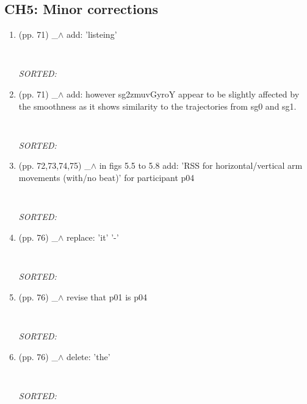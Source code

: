 \documentclass[12pt]{article}
\begin{document}
\subsection{CH5: Minor corrections}
\begin{enumerate}

\item  (pp. 71)  \_$\wedge$  
	add: 'listeing'
	\begin{verbatim}
	
	\end{verbatim}
	\textit{
	SORTED:  
	}
	\\

\item  (pp. 71)  \_$\wedge$  
	add: 
	however sg2zmuvGyroY appear to be slightly
	affected by the smoothness as it shows
	similarity to the trajectories from
	sg0 and sg1.
	\begin{verbatim}
	
	\end{verbatim}
	\textit{
	SORTED:  
	}
	\\


\item  (pp. 72,73,74,75)  \_$\wedge$  
	in figs 5.5 to 5.8
		add:
	'RSS for horizontal/vertical arm movements (with/no beat)' 
	for participant p04
	\begin{verbatim}
	
	\end{verbatim}
	\textit{
	SORTED:  
	}
	\\


\item  (pp. 76)  \_$\wedge$  
	replace: 'it' '-'
	\begin{verbatim}
	
	\end{verbatim}
	\textit{
	SORTED:  
	}
	\\

\item  (pp. 76)  \_$\wedge$  
	revise that p01 is p04
	\begin{verbatim}
	
	\end{verbatim}
	\textit{
	SORTED:  
	}
	\\

\item  (pp. 76)  \_$\wedge$  
	delete: 'the'	
	\begin{verbatim}
	
	\end{verbatim}
	\textit{
	SORTED:  
	}
	\\



\end{enumerate}
\end{document}
